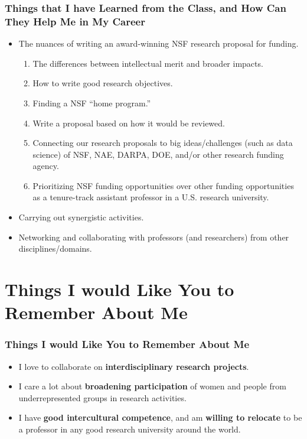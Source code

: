 \documentclass[xcolor={usenames,dvipsnames},hyperref={hyperindex,bookmarks}]{beamer}
\begin{document}
\frame
{
	\frametitle{Things that I have Learned from the Class, and How Can They Help Me in My Career}

	\begin{itemize}
	\item The nuances of writing an award-winning NSF research proposal for funding. %
		\begin{enumerate} %
		\item The differences between intellectual merit and broader impacts.
		\item How to write good research objectives.
		\item Finding a NSF ``home program.''
		\item Write a proposal based on how it would be reviewed.
		\item Connecting our research proposals to big ideas/challenges (such as data science) of NSF, NAE, DARPA, DOE, and/or other research funding agency.
		\item Prioritizing NSF funding opportunities over other funding opportunities as a tenure-track assistant professor in a U.S. research university.
		\end{enumerate}
	\item Carrying out synergistic activities.
	\item Networking and collaborating with professors (and researchers) from other disciplines/domains.
	\end{itemize}
}





\section{Things I would Like You to Remember About Me}

\frame
{
	\frametitle{Things I would Like You to Remember About Me}

	\begin{itemize}
	\item I love to collaborate on {\bf interdisciplinary research projects}.
	\item I care a lot about {\bf broadening participation} of women and people from underrepresented groups in research activities.
	\item I have {\bf good intercultural competence}, and am {\bf willing to relocate} to be a professor in any good research university around the world.
	\end{itemize}
}
\end{document}
